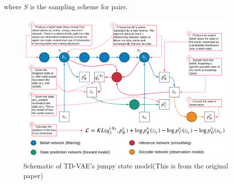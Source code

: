\documentclass[10pt,twocolumn,letterpaper]{article}
\begin{document}
	where $S$ is the sampling scheme for pairs.
	 
	\begin{figure}[htbp]
		\centering
		\includegraphics[width = 16cm]{TD-VAE-schematic.png}
		\caption{Schematic of TD-VAE's jumpy state model(This is from the original paper)}
		\label{fig:TDVAE_jumpy}
	\end{figure}
\end{document}
